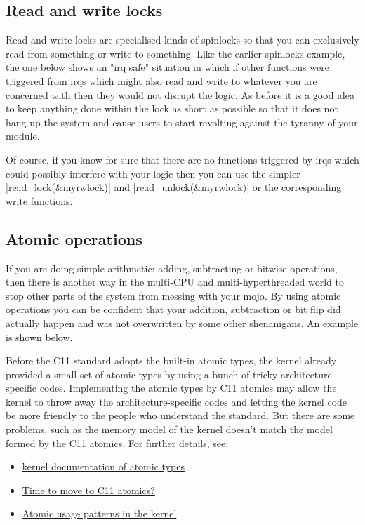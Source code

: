 \documentclass[10pt, oneside]{book}
\begin{document}
\subsection{Read and write locks}
\label{sec:rwlock}
Read and write locks are specialised kinds of spinlocks so that you can exclusively read from something or write to something.
Like the earlier spinlocks example, the one below shows an "irq safe" situation in which if other functions were triggered from irqs which might also read and write to whatever you are concerned with then they would not disrupt the logic.
As before it is a good idea to keep anything done within the lock as short as possible so that it does not hang up the system and cause users to start revolting against the tyranny of your module.


Of course, if you know for sure that there are no functions triggered by irqs which could possibly interfere with your logic then you can use the simpler \cpp|read_lock(&myrwlock)| and \cpp|read_unlock(&myrwlock)| or the corresponding write functions.
\subsection{Atomic operations}
\label{sec:atomics}
If you are doing simple arithmetic: adding, subtracting or bitwise operations, then there is another way in the multi-CPU and multi-hyperthreaded world to stop other parts of the system from messing with your mojo.
By using atomic operations you can be confident that your addition, subtraction or bit flip did actually happen and was not overwritten by some other shenanigans.
An example is shown below.


Before the C11 standard adopts the built-in atomic types, the kernel already provided a small set of atomic types by using a bunch of tricky architecture-specific codes.
Implementing the atomic types by C11 atomics may allow the kernel to throw away the architecture-specific codes and letting the kernel code be more friendly to the people who understand the standard.
But there are some problems, such as the memory model of the kernel doesn't match the model formed by the C11 atomics.
For further details, see:
\begin{itemize}
 \item \href{https://www.kernel.org/doc/Documentation/atomic_t.txt}{kernel documentation of atomic types}
 \item \href{https://lwn.net/Articles/691128/}{Time to move to C11 atomics?}
 \item \href{https://lwn.net/Articles/698315/}{Atomic usage patterns in the kernel}
\end{itemize}
\end{document}
